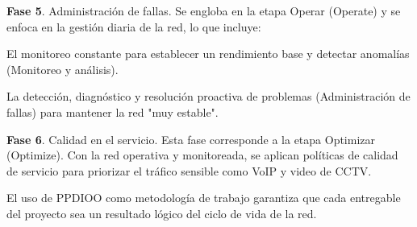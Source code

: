 \textbf{Fase 5}. Administración de fallas. Se engloba en la etapa Operar (Operate) y se enfoca en la gestión diaria de la red, lo que incluye:

El monitoreo constante para establecer un rendimiento base y detectar anomalías (Monitoreo y análisis).

La detección, diagnóstico y resolución proactiva de problemas (Administración de fallas) para mantener la red "muy estable".

\textbf{Fase 6}. Calidad en el servicio. Esta fase corresponde a la etapa Optimizar (Optimize). Con la red operativa y monitoreada, se aplican políticas de calidad de servicio para priorizar el tráfico sensible como VoIP y video de CCTV.

El uso de PPDIOO como metodología de trabajo garantiza que cada entregable del proyecto sea un resultado lógico del ciclo de vida de la red.

